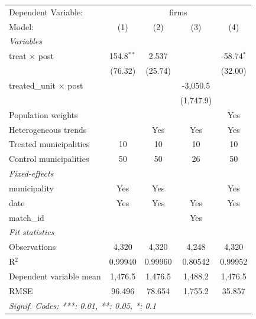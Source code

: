
\begingroup
\centering
\begin{tabular}{lcccc}
   \tabularnewline \midrule \midrule
   Dependent Variable: & \multicolumn{4}{c}{firms}\\
   Model:                        & (1)          & (2)     & (3)       & (4)\\  
   \midrule
   \emph{Variables}\\
   treat $\times$ post           & 154.8$^{**}$ & 2.537   &           & -58.74$^{*}$\\   
                                 & (76.32)      & (25.74) &           & (32.00)\\   
   treated\_unit $\times$ post   &              &         & -3,050.5  &   \\   
                                 &              &         & (1,747.9) &   \\   
   Population weights            &              &         &           & Yes\\  
   Heterogeneous trends          &              & Yes     & Yes       & Yes\\  
   Treated municipalities        & 10           & 10      & 10        & 10\\  
   Control municipalities        & 50           & 50      & 26        & 50\\  
   \midrule
   \emph{Fixed-effects}\\
   municipality                  & Yes          & Yes     &           & Yes\\  
   date                          & Yes          & Yes     & Yes       & Yes\\  
   match\_id                     &              &         & Yes       & \\  
   \midrule
   \emph{Fit statistics}\\
   Observations                  & 4,320        & 4,320   & 4,248     & 4,320\\  
   R$^2$                         & 0.99940      & 0.99960 & 0.80542   & 0.99952\\  
   Dependent variable mean       & 1,476.5      & 1,476.5 & 1,488.2   & 1,476.5\\  
   RMSE                          & 96.496       & 78.654  & 1,755.2   & 35.857\\  
   \midrule \midrule
   \multicolumn{5}{l}{\emph{Signif. Codes: ***: 0.01, **: 0.05, *: 0.1}}\\
\end{tabular}
\par\endgroup


